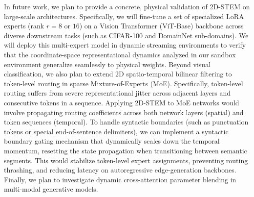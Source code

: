 In future work, we plan to provide a concrete, physical validation of 2D-STEM on large-scale architectures. Specifically, we will fine-tune a set of specialized LoRA experts (rank $r = 8$ or $16$) on a Vision Transformer (ViT-Base) backbone across diverse downstream tasks (such as CIFAR-100 and DomainNet sub-domains). We will deploy this multi-expert model in dynamic streaming environments to verify that the coordinate-space representational dynamics analyzed in our sandbox environment generalize seamlessly to physical weights. Beyond visual classification, we also plan to extend 2D spatio-temporal bilinear filtering to token-level routing in sparse Mixture-of-Experts (MoE). Specifically, token-level routing suffers from severe representational jitter across adjacent layers and consecutive tokens in a sequence. Applying 2D-STEM to MoE networks would involve propagating routing coefficients across both network layers (spatial) and token sequences (temporal). To handle syntactic boundaries (such as punctuation tokens or special end-of-sentence delimiters), we can implement a syntactic boundary gating mechanism that dynamically scales down the temporal momentum, resetting the state propagation when transitioning between semantic segments. This would stabilize token-level expert assignments, preventing routing thrashing, and reducing latency on autoregressive edge-generation backbones. Finally, we plan to investigate dynamic cross-attention parameter blending in multi-modal generative models.
